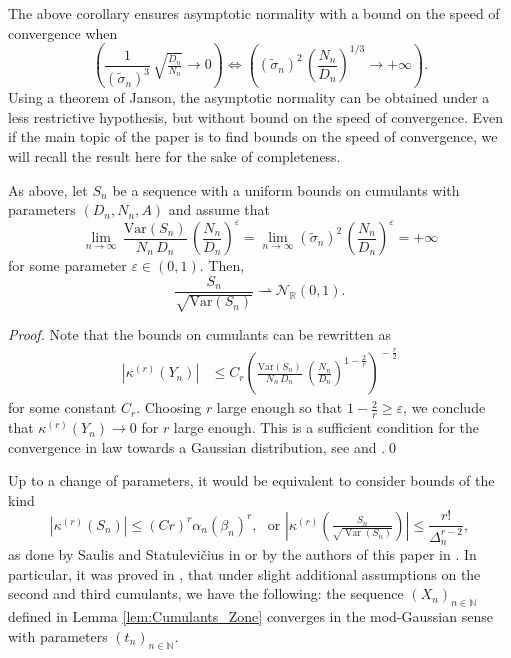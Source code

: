 \documentclass[envcountsame]{svmult}
\newcommand{\N}{\mathbb{N}}
\newcommand{\R}{\mathbb{R}}
\newcommand{\eps}{\varepsilon}
\newcommand{\var}{\mathrm{Var}}
\newcommand{\gauss}{\mathcal{N}_{\R}(0,1)}
\DeclareMathOperator{\Var}{Var}
\begin{document}
The above corollary ensures asymptotic normality with a bound on the speed of convergence
when $$\left(\frac{1}{(\widetilde{\sigma}_n)^3}\,\sqrt{\tfrac{D_n}{N_n}} \to 0 \right) \iff \left( (\widetilde{\sigma}_n)^2\,\left(\frac{N_n}{D_n}\right)^{\!1/3} \to +\infty \right).$$
Using a theorem of Janson, 
the asymptotic normality can be obtained under a less restrictive hypothesis,
but without bound on the speed of convergence.
Even if the main topic of the paper is to find bounds on the speed of convergence,
we will recall the result here for the sake of completeness.
\begin{proposition}
  As above, let $S_n$ be a sequence with a uniform bounds on cumulants with parameters $(D_n,N_n,A)$
	and assume that
    $$\lim_{n \to \infty}\, \frac{\var(S_n)}{N_n\, D_n}\,\left(\frac{N_n}{D_n}\right)^{\!\eps} = \lim_{n \to \infty}(\widetilde{\sigma}_n)^2\,\left(\frac{N_n}{D_n}\right)^{\!\eps}= +\infty $$
	for some parameter $\eps \in (0,1)$. Then, 
	$$\frac{S_n}{\sqrt{\var(S_n)}} \rightharpoonup \gauss.$$
  \label{thm:CLT_Janson}
\end{proposition}

\begin{proof}
Note that the bounds on cumulants can be rewritten as
\begin{align*}
|\kappa^{(r)}(Y_n)| &\leq C_r\left(\frac{\var(S_n)}{N_n\,D_n}\,\left(\frac{N_n}{D_n}\right)^{1-\frac{2}{r}}\right)^{\!\!-\frac{r}{2}}
\end{align*}
for some constant $C_r$. Choosing $r$ large enough so that $1-\frac{2}{r} \geq \eps$, we conclude that $\kappa^{(r)}(Y_n) \to 0 $ for $r$ large enough. This is a sufficient condition for the convergence in law towards a Gaussian distribution, see \cite[Theorem 1]{Jan88} and \cite{Gri92}.\qed
\end{proof}
\begin{remark}
  Up to a change of parameters, it would be equivalent to consider bounds of the kind
  \[|\kappa^{(r)}(S_n)| \leq (Cr)^r \alpha_n (\beta_n)^r,\,\,
  \text{ or } \left|\kappa^{(r)}\!\left(\tfrac{S_n}{\sqrt{\Var(S_n)}}\right) \right| \le \frac{r!}{\Delta_n^{r-2}},\]
  as done by Saulis and Statulevi\v{c}ius in \cite{LivreOrange:Cumulants}
  or by the authors of this paper in \cite{FMN16}.
  In particular, it was proved in \cite[Chapter 5]{FMN16}, that under slight additional assumptions
  on the second and third cumulants, we have the following:
  the sequence $(X_n)_{n \in \N}$ defined in Lemma \ref{lem:Cumulants_Zone}
  converges in the mod-Gaussian sense with parameters $(t_n)_{n \in \N}$.
\end{remark}
\end{document}
